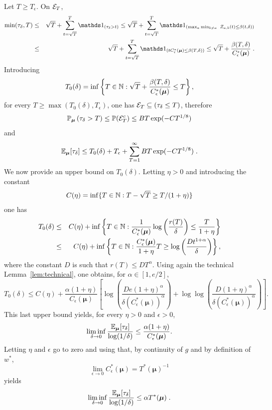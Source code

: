\documentclass{colt2016} %
\begin{document}
Let $T \geq T_\epsilon$. On $\mathcal{E}_T$, 
\begin{eqnarray*}
 \min(\tau_\delta,T) & \leq & \sqrt{T} + \sum_{t=\sqrt{T}}^T \ind_{\left(\tau_\delta > t\right)} \leq \sqrt{T} + \sum_{t=\sqrt{T}}^T \ind_{\left(\max_a \min_{b \neq a} \ Z_{a,b}(t) \leq \beta(t,\delta)\right)} \\
 & \leq & \sqrt{T} + \sum_{t=\sqrt{T}}^T \ind_{\left(t C_\epsilon^*(\bm\mu) \leq \beta(T,\delta)\right)} \leq \sqrt{T} + \frac{\beta(T,\delta)}{C_\epsilon^*(\bm \mu)}\;.
\end{eqnarray*}
Introducing 
\[T_0(\delta) = \inf \left\{ T \in \mathbb{N} : \sqrt{T} + \frac{\beta(T,\delta)}{C_\epsilon^*(\bm \mu)} \leq T \right\},\]
for every $T \geq \max (T_0(\delta), T_\epsilon)$, one has $\mathcal{E}_T \subseteq (\tau_\delta \leq T)$, therefore 
\[\mathbb{P}_{\bm \mu}\left(\tau_\delta > T\right) \leq \mathbb{P}(\mathcal{E}_T^c) \leq BT \exp(-C T^{1/8})\]
and
\[\mathbb{E}_{\bm \mu}[\tau_\delta] \leq T_0(\delta) + T_\epsilon + \sum_{T=1}^\infty BT \exp(-C T^{1/8})\;.\]
We now provide an upper bound on $T_0(\delta)$. Letting $\eta >0$ and introducing the constant 
\[C(\eta) = \inf \{ T \in \mathbb{N} : T - \sqrt{T} \geq T/(1+\eta)\}\]
one has 
\begin{eqnarray*}
 T_0(\delta) & \leq & C(\eta) + \inf \left\{T \in \mathbb{N} : \frac{1}{C_\epsilon^*(\bm\mu)} \log\left(\frac{r(T)}{\delta}\right) \leq \frac{T}{1+\eta}\right\} \\
 & \leq & C(\eta) + \inf \left\{T \in \mathbb{N} : \frac{C_\epsilon^*(\bm\mu)}{1+\eta} T \geq \log\left(\frac{Dt^{1+\alpha}}{\delta}\right) \right\},
\end{eqnarray*}
where the constant $D$ is such that $r(T) \leq D T^\alpha$. Using again the technical Lemma~\ref{lem:technical}, one obtains, for $\alpha \in [1,e/2]$, 
\[T_0(\delta) \leq C(\eta) + \frac{\alpha(1+\eta)}{C_\epsilon(\bm \mu)}\left[\log \left(\frac{De(1+\eta)^\alpha}{\delta (C_\epsilon^*(\bm\mu))^\alpha}\right) +  \log\log \left(\frac{D(1+\eta)^\alpha}{\delta (C_\epsilon^*(\bm\mu))^\alpha}\right) \right].\]
This last upper bound yields, for every $\eta>0$ and $\epsilon>0$, 
\[\liminf_{\delta \rightarrow 0} \frac{\mathbb{E}_{\bm \mu}[\tau_\delta]}{\log(1/\delta)} \leq \frac{\alpha (1+\eta)}{C_\epsilon^*(\bm \mu)}.\]
Letting $\eta$ and $\epsilon$ go to zero and using that, by continuity of $g$ and by definition of $w^*$,
\[\lim_{\epsilon \rightarrow 0} C_\epsilon^*(\bm \mu) = T^*(\bm \mu)^{-1}\]
yields 
\[\liminf_{\delta \rightarrow 0} \frac{\mathbb{E}_{\bm \mu}[\tau_\delta]}{\log(1/\delta)} \leq \alpha T^*(\bm \mu)\;.\]
\end{document}
